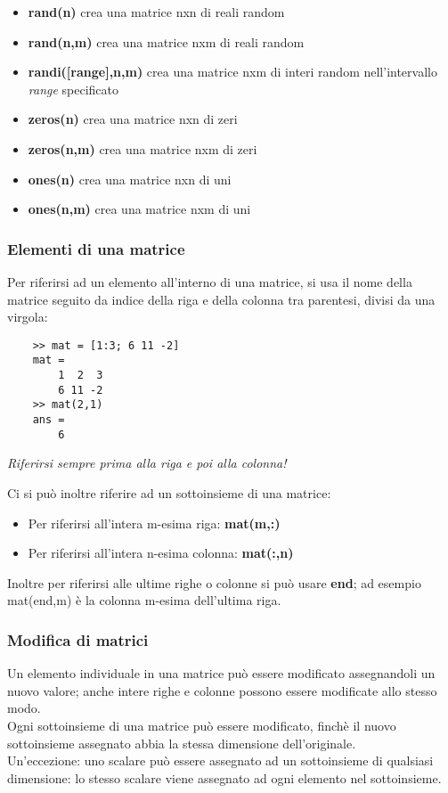 \documentclass[a4paper, 10pt]{article}
\begin{document}
\begin{itemize}
\item \textbf{rand(n)} crea una matrice nxn di reali random
\item \textbf{rand(n,m)} crea una matrice nxm di reali random
\item \textbf{randi([range],n,m)} crea una matrice nxm di interi random nell'intervallo \textit{range} specificato
\item \textbf{zeros(n)} crea una matrice nxn di zeri
\item \textbf{zeros(n,m)} crea una matrice nxm di zeri
\item \textbf{ones(n)} crea una matrice nxn di uni
\item \textbf{ones(n,m)} crea una matrice nxm di uni
\end{itemize}

\subsubsection{Elementi di una matrice}
Per riferirsi ad un elemento all'interno di una matrice, si usa il nome della matrice seguito da indice della riga e della colonna tra parentesi, divisi da una virgola:

\begin{lstlisting}
	>> mat = [1:3; 6 11 -2]
	mat =
		1  2  3
		6 11 -2
	>> mat(2,1)
	ans =
		6
\end{lstlisting}
\emph{Riferirsi sempre prima alla riga e poi alla colonna!}

Ci si può inoltre riferire ad un sottoinsieme di una matrice:
\begin{itemize}
\item Per riferirsi all'intera m-esima riga: \textbf{mat(m,:)}
\item Per riferirsi all'intera n-esima colonna: \textbf{mat(:,n)}
\end{itemize}
Inoltre per riferirsi alle ultime righe o colonne si può usare \textbf{end}; ad esempio mat(end,m) è la colonna m-esima dell'ultima riga. 

\subsubsection{Modifica di matrici}
Un elemento individuale in una matrice può essere modificato assegnandoli un nuovo valore; anche intere righe e colonne possono essere modificate allo stesso modo.\\
Ogni sottoinsieme di una matrice può essere modificato, finchè il nuovo sottoinsieme assegnato abbia la stessa dimensione dell'originale.\\
Un'eccezione: uno scalare può essere assegnato ad un sottoinsieme di qualsiasi dimensione: lo stesso scalare viene assegnato ad ogni elemento nel sottoinsieme.
\end{document}
